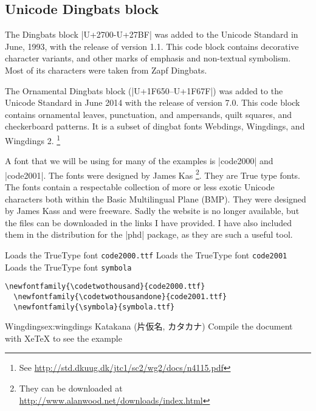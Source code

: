 \subsection{Unicode Dingbats block}

The Dingbats block |U+2700-U+27BF| was added to the Unicode Standard in June, 1993, with the release of version 1.1. This code block  contains decorative character variants, and other marks of emphasis and non-textual symbolism. Most of its characters were taken from Zapf Dingbats. 

The Ornamental Dingbats block (|U+1F650–U+1F67F|) was added to the Unicode Standard in June 2014 with the release of version 7.0. This code block contains ornamental leaves, punctuation, and ampersands, quilt squares, and checkerboard patterns. It is a subset of dingbat fonts Webdings, Wingdings, and Wingdings 2. \footnote{See \url{http://std.dkuug.dk/jtc1/sc2/wg2/docs/n4115.pdf}}

A font that we will be using for many of the \XeLaTeX examples is |code2000|
and |code2001|. The fonts were designed by James Kas
\footnote{They can be downloaded at \url{http://www.alanwood.net/downloads/index.html}}. They are True type fonts. The fonts contain a respectable collection of more or less exotic Unicode characters both within the Basic Multilingual Plane (BMP). They were designed by James Kass and were freeware. Sadly the website is no longer available, but the files can be downloaded in the links I have provided. I have also included them in the distribution for the |phd| package, as they are such a useful tool.


\CMDI{\codetwothousand} Loads the TrueType font \texttt{code2000.ttf}
\CMDI{\codetwothousandone} Loads the TrueType font \texttt{code2001}
\CMDI{\symbola} Loads the TrueType font \texttt{symbola}
\begin{verbatim}
\newfontfamily{\codetwothousand}{code2000.ttf}
  \newfontfamily{\codetwothousandone}{code2001.ttf}
  \newfontfamily{\symbola}{symbola.ttf}
\end{verbatim}



\begin{texexample}{Wingdings}{ex:wingdings}
\ifxetex
   {\codetwothousand {} 
    Katakana (片仮名, カタカナ)
   \codetwothousandone {}
   \symbola {}
  }
\else
   Compile the document with XeTeX to see the example
\fi
\end{texexample}

